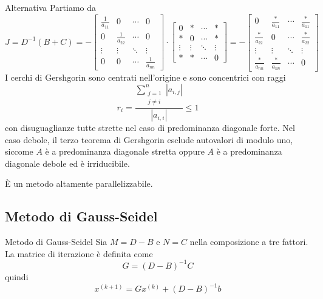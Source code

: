 \documentclass[a4paper]{article}
\begin{document}
\begin{snippetproof}{Alternativa}
    Partiamo da \[
        J = D^{-1}(B+C)
        = -
        \begin{bmatrix}
            \frac{1}{a_{11}} & 0 & \cdots & 0 \\
            0 & \frac{1}{a_{22}} & \cdots & 0 \\
            \vdots & \vdots & \ddots & \vdots \\
            0 & 0 & \cdots & \frac{1}{a_{nn}}
        \end{bmatrix}
        \cdot
        \begin{bmatrix}
            0 & \ast & \cdots & \ast \\
            \ast & 0 & \cdots & \ast \\
            \vdots & \vdots & \ddots & \vdots \\
            \ast & \ast & \cdots & 0
        \end{bmatrix}
        =
        -
        \begin{bmatrix}
            0 & \frac{\ast}{a_{11}} & \cdots & \frac{\ast}{a_{11}} \\
            \frac{\ast}{a_{22}} & 0 & \cdots & \frac{\ast}{a_{22}} \\
            \vdots & \vdots & \ddots & \vdots \\
            \frac{\ast}{a_{nn}} & \frac{\ast}{a_{nn}} & \cdots & 0
        \end{bmatrix}
    \]
    I cerchi di Gershgorin sono centrati nell'origine e sono concentrici con raggi
    \[
        r_i = \frac{
            \sum_{\substack{j=1 \\ j \neq i}}^n |a_{i,j}|
        }{
            |a_{i,i}|
        } \leq 1
    \]
    con disuguaglianze tutte strette nel caso di predominanza diagonale forte. Nel caso debole, il terzo teorema di Gershgorin esclude autovalori di modulo uno,
    siccome \(A\) è a predominanza diagonale stretta oppure \(A\)
    è a predominanza diagonale debole ed è irriducibile.
\end{snippetproof}

È un metodo altamente parallelizzabile.

\subsection{Metodo di Gauss-Seidel}

\begin{snippetdefinition}{Metodo di Gauss-Seidel}
    Sia \(M = D-B\) e \(N=C\) nella composizione a tre fattori.
    La matrice di iterazione è definita come
    \[
        G = (D-B)^{-1}C
    \]
    quindi
    \[
        x^{(k+1)}
        = Gx^{(k)} + (D-B)^{-1}b
    \]
\end{snippetdefinition}
\end{document}

